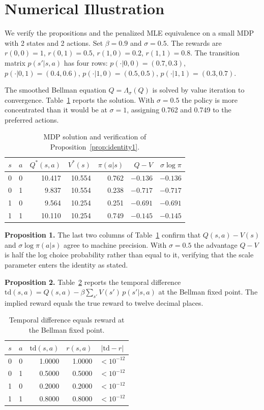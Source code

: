\documentclass[11pt]{article}
\begin{document}
\section{Numerical Illustration}
\label{sec:numerical}

We verify the propositions and the penalized MLE equivalence on a small MDP with 2 states and 2 actions. Set $\beta = 0.9$ and $\sigma = 0.5$. The rewards are $r(0,0) = 1$, $r(0,1) = 0.5$, $r(1,0) = 0.2$, $r(1,1) = 0.8$. The transition matrix $p(s'|s,a)$ has four rows:
$p(\cdot|0,0) = (0.7, 0.3)$, $p(\cdot|0,1) = (0.4, 0.6)$, $p(\cdot|1,0) = (0.5, 0.5)$, $p(\cdot|1,1) = (0.3, 0.7)$.

The smoothed Bellman equation $Q = \Lambda_\sigma(Q)$ is solved by value iteration to convergence. Table~\ref{tab:mdp} reports the solution. With $\sigma = 0.5$ the policy is more concentrated than it would be at $\sigma = 1$, assigning 0.762 and 0.749 to the preferred actions.

\begin{table}[ht]
\centering
\caption{MDP solution and verification of Proposition~\ref{prop:identity1}.}
\label{tab:mdp}
\begin{tabular}{ccrrrrr}
\hline
$s$ & $a$ & $Q^*(s,a)$ & $V^*(s)$ & $\pi(a|s)$ & $Q{-}V$ & $\sigma\log\pi$ \\
\hline
0 & 0 & 10.417 & 10.554 & 0.762 & $-0.136$ & $-0.136$ \\
0 & 1 & ~9.837 & 10.554 & 0.238 & $-0.717$ & $-0.717$ \\
1 & 0 & ~9.564 & 10.254 & 0.251 & $-0.691$ & $-0.691$ \\
1 & 1 & 10.110 & 10.254 & 0.749 & $-0.145$ & $-0.145$ \\
\hline
\end{tabular}
\end{table}

\noindent\textbf{Proposition 1.} The last two columns of Table~\ref{tab:mdp} confirm that $Q(s,a) - V(s)$ and $\sigma\log\pi(a|s)$ agree to machine precision. With $\sigma = 0.5$ the advantage $Q - V$ is half the log choice probability rather than equal to it, verifying that the scale parameter enters the identity as stated.

\noindent\textbf{Proposition 2.} Table~\ref{tab:td} reports the temporal difference $\mathrm{td}(s,a) = Q(s,a) - \beta\sum_{s'} V(s')\,p(s'|s,a)$ at the Bellman fixed point. The implied reward equals the true reward to twelve decimal places.

\begin{table}[ht]
\centering
\caption{Temporal difference equals reward at the Bellman fixed point.}
\label{tab:td}
\begin{tabular}{ccrrc}
\hline
$s$ & $a$ & $\mathrm{td}(s,a)$ & $r(s,a)$ & $|\mathrm{td} - r|$ \\
\hline
0 & 0 & 1.0000 & 1.0000 & ${<}10^{-12}$ \\
0 & 1 & 0.5000 & 0.5000 & ${<}10^{-12}$ \\
1 & 0 & 0.2000 & 0.2000 & ${<}10^{-12}$ \\
1 & 1 & 0.8000 & 0.8000 & ${<}10^{-12}$ \\
\hline
\end{tabular}
\end{table}
\end{document}
